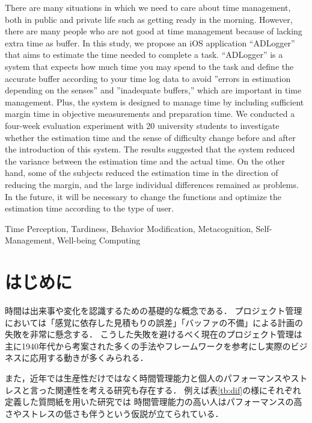 \documentclass[submit,techrep,noauthor]{ipsj}
\begin{document}
\begin{eabstract}
There are many situations in which we need to care about time management, both in public and private life such as getting ready in the morning. However, there are many people who are not good at time management because of lacking extra time as buffer. In this study, we propose an iOS application “ADLogger” that aims to estimate the time needed to complete a task. “ADLogger” is a system that expects how much time you may spend to the task and define the accurate buffer according to your time log data to avoid ”errors in estimation depending on the senses” and ”inadequate buffers,” which are important in time management. Plus, the system is designed to manage time by including sufficient margin time in objective measurements and preparation time. We conducted a four-week evaluation experiment with 20 university students to investigate whether the estimation time and the sense of difficulty change before and after the introduction of this system. The results suggested that the system reduced the variance between the estimation time and the actual time. On the other hand, some of the subjects reduced the estimation time in the direction of reducing the margin, and the large individual differences remained as problems. In the future, it will be necessary to change the functions and optimize the estimation time according to the type of user.
\end{eabstract}

\begin{ekeyword}
Time Perception, Tardiness, Behavior Modification, Metacognition, Self-Management, Well-being Computing
\end{ekeyword}

\maketitle

\section{はじめに}
時間は出来事や変化を認識するための基礎的な概念である\cite{history}．
プロジェクト管理においては「感覚に依存した見積もりの誤差」「バッファの不備」による計画の失敗を非常に懸念する．
こうした失敗を避けるべく現在のプロジェクト管理は主に1940年代から考案された多くの手法やフレームワークを参考にし実際のビジネスに応用する動きが多くみられる．

また，近年では生産性だけではなく時間管理能力と個人のパフォーマンスやストレスと言った関連性を考える研究も存在する．
例えば表\ref{tb:dif}の様にそれぞれ定義した質問紙を用いた研究では
時間管理能力の高い人はパフォーマンスの高さ\cite{Britton1991}\cite{Trueman1996}やストレスの低さ\cite{Macan1994}も伴うという仮説が立てられている\cite{Claessens2007}．
\end{document}
